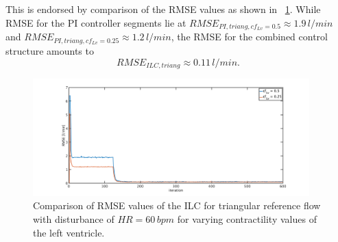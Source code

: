 This is endorsed by comparison of the RMSE values as shown in \figurename~\ref{fig:RMSE_dist_triang_var_cf}. While RMSE for the PI controller segments lie at $RMSE_{PI,triang,cf_{Lv}=0.5}\approx 1.9\, l/min$ and $RMSE_{PI,triang,cf_{Lv}=0.25}\approx 1.2\, l/min$, the RMSE for the combined control structure amounts to
\begin{equation}
  RMSE_{ILC,triang}\approx 0.11\, l/min.
\end{equation}
\begin{figure}[ht!]
  \centering
  \includegraphics[width=0.95\textwidth]{images/chapt_5/ILC/RMSE_dist_triang_var_cf.pdf}
  \caption[RMSE Comparison of ILC at triangular reference flow for varying left ventricular contractilities]{Comparison of RMSE values of the ILC for triangular reference flow with disturbance of $HR=60\,bpm$ for varying contractility values of the left ventricle.}
  \label{fig:RMSE_dist_triang_var_cf}
\end{figure}

